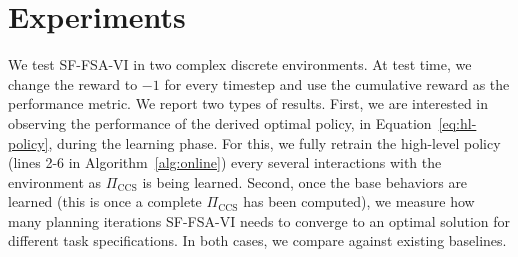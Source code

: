 \section{Experiments}
We test SF-FSA-VI in two complex discrete environments. At test time, we change the reward to $-1$ for every timestep and use the cumulative reward as the performance metric. We report two types of results. First, we are interested in observing the performance of the derived optimal policy, in Equation~\eqref{eq:hl-policy}, during the learning phase. For this, we fully retrain the high-level policy (lines 2-6 in Algorithm~\ref{alg:online}) every several interactions with the environment as $\Pi_\text{CCS}$ is being learned. Second, once the base behaviors are learned (this is once a complete $\Pi_\text{CCS}$ has been computed), we measure how many planning iterations SF-FSA-VI needs to converge to an optimal solution for different task specifications. In both cases, we compare against existing baselines.

